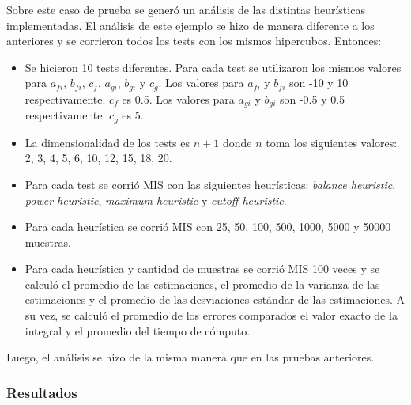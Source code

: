 \documentclass{article}
\begin{document}
Sobre este caso de prueba se generó un análisis de las distintas heurísticas implementadas.
El análisis de este ejemplo se hizo de manera diferente a los anteriores y se corrieron todos los tests con los mismos hipercubos.
Entonces:
\begin{itemize}
\item Se hicieron 10 tests diferentes. Para cada test se utilizaron los mismos valores para \( a_{fi} \), \( b_{fi} \), \( c_f \), \( a_{gi} \), \( b_{gi} \) y \( c_g \).
      Los valores para \( a_{fi} \) y \( b_{fi} \) son -10 y 10 respectivamente. \( c_f \) es 0.5.
      Los valores para \( a_{gi} \) y \( b_{gi} \) son -0.5 y 0.5 respectivamente. \( c_g \) es 5.
\item La dimensionalidad de los tests es \( n + 1 \) donde \( n \) toma los siguientes valores: 2, 3, 4, 5, 6, 10, 12, 15, 18, 20.
\item Para cada test se corrió MIS con las siguientes heurísticas: \textit{balance heuristic}, \textit{power heuristic}, \textit{maximum heuristic} y \textit{cutoff heuristic}.
\item Para cada heurística se corrió MIS con 25, 50, 100, 500, 1000, 5000 y 50000 muestras.
\item Para cada heurística y cantidad de muestras se corrió MIS 100 veces y se calculó el promedio de las estimaciones,
      el promedio de la varianza de las estimaciones y el promedio de las desviaciones estándar de las estimaciones.
      A su vez, se calculó el promedio de los errores comparados el valor exacto de la integral y el promedio del tiempo de cómputo.
\end{itemize}

Luego, el análisis se hizo de la misma manera que en las pruebas anteriores.

\subsubsection{Resultados}
\end{document}
